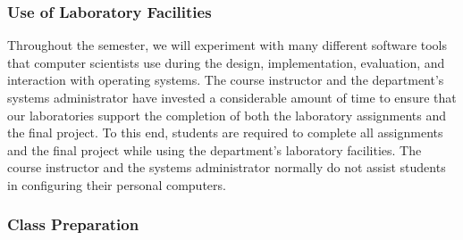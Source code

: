 %
%

\subsubsection*{Use of Laboratory Facilities}

Throughout the semester, we will experiment with many different software tools that computer scientists use during the
design, implementation, evaluation, and interaction with operating systems.  The course instructor and the
department's systems administrator have invested a considerable amount of time to ensure that our laboratories support
the completion of both the laboratory assignments and the final project.  To this end, students are required to complete
all assignments and the final project while using the department's laboratory facilities. The course instructor and the
systems administrator normally do not assist students in configuring their personal computers.

\subsubsection*{Class Preparation}

%

